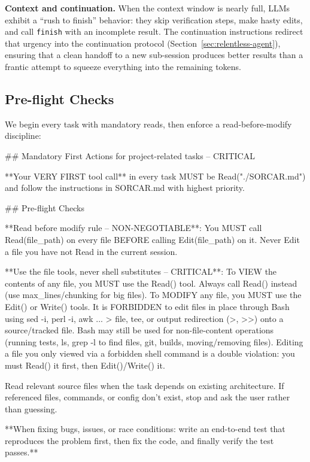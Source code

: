 \documentclass{article}
\begin{document}
\textbf{Context and continuation.}  When the context window is nearly full, LLMs exhibit a ``rush to finish'' behavior: they skip verification steps, make hasty edits, and call \texttt{finish} with an incomplete result.  The continuation instructions redirect that urgency into the continuation protocol (Section~\ref{sec:relentless-agent}), ensuring that a clean handoff to a new sub-session produces better results than a frantic attempt to squeeze everything into the remaining tokens.

\subsection{Pre-flight Checks}

We begin every task with mandatory reads, then enforce a read-before-modify discipline:

\begin{prompt}
## Mandatory First Actions for project-related
tasks -- CRITICAL

**Your VERY FIRST tool call** in every task MUST be
Read("./SORCAR.md") and follow the instructions
in SORCAR.md with highest priority.

## Pre-flight Checks

**Read before modify rule -- NON-NEGOTIABLE**: You MUST
call Read(file_path) on every file BEFORE calling
Edit(file_path) on it. Never Edit a file you have not
Read in the current session.

**Use the file tools, never shell substitutes --
CRITICAL**: To VIEW the contents of any file, you MUST
use the Read() tool. Always call Read() instead (use
max_lines/chunking for big files). To MODIFY any file,
you MUST use the Edit() or Write() tools. It is
FORBIDDEN to edit files in place through Bash using
sed -i, perl -i, awk ... > file, tee, or output
redirection (>, >>) onto a source/tracked file. Bash
may still be used for non-file-content operations
(running tests, ls, grep -l to find files, git, builds,
moving/removing files). Editing a file you only viewed
via a forbidden shell command is a double violation:
you must Read() it first, then Edit()/Write() it.

Read relevant source files when the task depends on
existing architecture. If referenced files, commands, or
config don't exist, stop and ask the user rather than
guessing.

**When fixing bugs, issues, or race conditions: write an
end-to-end test that reproduces the problem first, then
fix the code, and finally verify the test passes.**
\end{prompt}
\end{document}
